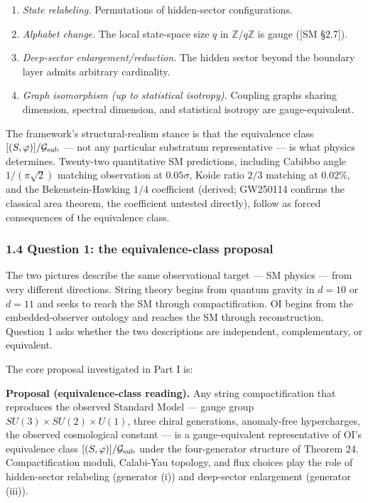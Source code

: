 \documentclass[
]{article}
\providecommand{\tightlist}{%
  \setlength{\itemsep}{0pt}\setlength{\parskip}{0pt}}
\begin{document}
\begin{enumerate}
\def\labelenumi{(\roman{enumi})}
\tightlist
\item
  \emph{State relabeling.} Permutations of hidden-sector configurations.
\item
  \emph{Alphabet change.} The local state-space size \(q\) in
  \(\mathbb{Z}/q\mathbb{Z}\) is gauge ({[}SM §2.7{]}).
\item
  \emph{Deep-sector enlargement/reduction.} The hidden sector beyond the
  boundary layer admits arbitrary cardinality.
\item
  \emph{Graph isomorphism (up to statistical isotropy).} Coupling graphs
  sharing dimension, spectral dimension, and statistical isotropy are
  gauge-equivalent.
\end{enumerate}

The framework's structural-realism stance is that the equivalence class
\([(S, \varphi)]/\mathcal{G}_{\rm sub}\) --- not any particular
substratum representative --- is what physics determines. Twenty-two
quantitative SM predictions, including Cabibbo angle \(1/(\pi\sqrt{2})\)
matching observation at \(0.05\sigma\), Koide ratio \(2/3\) matching at
0.02\%, and the Bekenstein-Hawking \(1/4\) coefficient (derived;
GW250114 confirms the classical area theorem, the coefficient untested
directly), follow as forced consequences of the equivalence class.

\hypertarget{question-1-the-equivalence-class-proposal}{%
\subsubsection{1.4 Question 1: the equivalence-class
proposal}\label{question-1-the-equivalence-class-proposal}}

The two pictures describe the same observational target --- SM physics
--- from very different directions. String theory begins from quantum
gravity in \(d=10\) or \(d=11\) and seeks to reach the SM through
compactification. OI begins from the embedded-observer ontology and
reaches the SM through reconstruction. Question 1 asks whether the two
descriptions are independent, complementary, or equivalent.

The core proposal investigated in Part I is:

\textbf{Proposal (equivalence-class reading).} Any string
compactification that reproduces the observed Standard Model --- gauge
group \(SU(3) \times SU(2) \times U(1)\), three chiral generations,
anomaly-free hypercharges, the observed cosmological constant --- is a
gauge-equivalent representative of OI's equivalence class
\([(S, \varphi)]/\mathcal{G}_{\rm sub}\) under the four-generator
structure of Theorem 24. Compactification moduli, Calabi-Yau topology,
and flux choices play the role of hidden-sector relabeling (generator
(i)) and deep-sector enlargement (generator (iii)).
\end{document}
